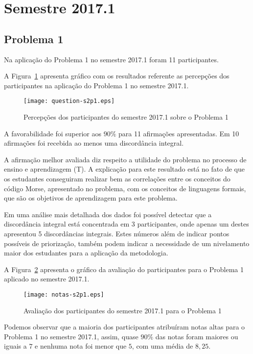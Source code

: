 \section{Semestre 2017.1}
\label{sec-sem-2017}

\subsection{Problema 1}
Na aplicação do Problema 1 no semestre 2017.1 foram 11 participantes.

A Figura~\ref{percep-s2p1} apresenta gráfico com os resultados referente
as percepções dos participantes na aplicação do
Problema 1 no semestre 2017.1.

\begin{figure}[!htb]
\centering
\texttt{[image: question-s2p1.eps]}
\caption{Percepções dos participantes do semestre 2017.1 sobre o Problema 1}
\label{percep-s2p1}
\end{figure}

A favorabilidade foi superior aos $90\%$ para 11 afirmações apresentadas.
Em 10 afirmações foi recebida ao menos uma discordância integral.

A afirmação melhor avaliada diz respeito a utilidade do problema no
processo de ensino e aprendizagem (T).
A explicação para este resultado está no fato de que os estudantes
conseguiram realizar bem as correlações entre os conceitos
do código Morse, apresentado no problema, com os conceitos de
linguagens formais, que são os objetivos de aprendizagem para
este problema.

Em uma análise mais detalhada dos dados foi possível
detectar que a discordância integral está concentrada
em 3 participantes, onde apenas um destes apresentou
5 discordâncias integrais.
Estes números além de indicar pontos possíveis de
priorização, também podem indicar a necessidade
de um nivelamento maior dos estudantes para a aplicação
da metodologia.

A Figura~\ref{aval-s2p1} apresenta o gráfico da
avaliação do participantes para o Problema 1 aplicado no semestre 2017.1.

\begin{figure}[!htb]
\centering
\texttt{[image: notas-s2p1.eps]}
\caption{Avaliação dos participantes do semestre 2017.1 para o Problema 1}
\label{aval-s2p1}
\end{figure}

Podemos observar que a maioria dos participantes atribuíram
notas altas para o Problema 1 no semestre 2017.1, assim, quase $90\%$ das notas
foram maiores ou iguais a $7$ e nenhuma nota foi menor que $5$, com uma média
de $8,25$.

